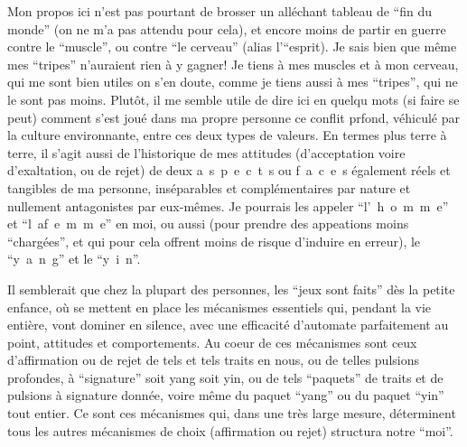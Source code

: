 Mon propos ici n'est pas pourtant de brosser un alléchant tableau de ``fin du monde'' (on ne m'a pas attendu pour cela), et encore moins de partir en guerre contre le ``muscle'', ou contre ``le cerveau'' (alias l'``esprit). Je sais bien que même mes ``tripes'' n'auraient rien à y gagner! Je tiens à mes muscles et à mon cerveau, qui me sont bien utiles on s'en doute, comme je tiens aussi à mes ``tripes'', qui ne le sont pas moins. Plutôt, il me semble utile de dire ici en quelqu mots (si faire se peut) comment s'est joué dans ma propre personne ce conflit prfond, véhiculé par la culture environnante, entre ces deux types de valeurs. En termes plus terre à terre, il s'agit aussi de l'historique de mes attitudes (d'acceptation voire d'exaltation, ou de rejet) de deux \mbox{a s p e c t s} ou \mbox{f a c e s} également réels et tangibles de ma personne, inséparables et complémentaires par nature\handwritten{\unsure{,}} et nullement antagonistes par eux-mêmes. Je pourrais les appeler ``\mbox{l' h o m m e}'' et ``\mbox{l a\quad f e m m e}'' en moi, ou aussi (pour prendre des appeations moins ``chargées'', et qui pour cela offrent moins de risque d'induire en erreur), le ``\mbox{y a n g}'' et le ``\mbox{y i n}''.

Il semblerait que chez la plupart des personnes, les ``jeux sont faits'' dès la petite enfance, où se mettent en place les mécanismes essentiels qui, pendant la vie entière, vont dominer en silence, avec une efficacité d'automate parfaitement au point, attitudes et comportements. Au coeur de ces mécanismes sont ceux d'affirmation ou de rejet de tels et tels traits en nous, ou de telles pulsions profondes, à ``signature'' soit yang soit yin, ou de tels  ``paquets'' de traits et de pulsions à signature donnée, voire même du paquet ``yang'' ou du paquet ``yin'' tout entier. Ce sont ces mécanismes qui, dans une très large mesure, déterminent tous les autres mécanismes de choix (affirmation ou rejet) structura notre ``moi''.



